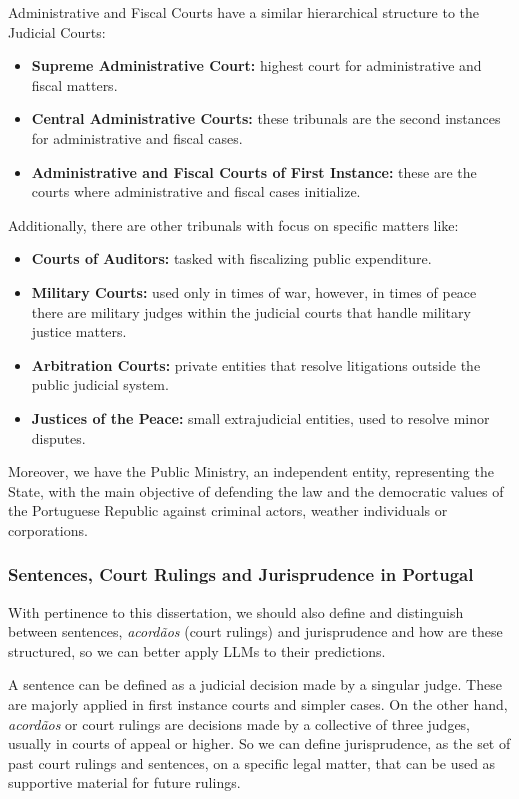 \documentclass[11pt,a4paper,twoside,openright]{book}
\begin{document}
Administrative and Fiscal Courts have a similar hierarchical structure to the Judicial Courts:

\begin{itemize}

    \item \textbf{Supreme Administrative Court:} highest court for administrative and fiscal matters.
    \item \textbf{Central Administrative Courts:} these tribunals are the second instances for administrative and fiscal cases.
    \item \textbf{Administrative and Fiscal Courts of First Instance:} these are the courts where administrative and fiscal cases initialize.        
\end{itemize}

Additionally, there are other tribunals with focus on specific matters like:
\begin{itemize}
    \item \textbf{Courts of Auditors:} tasked with fiscalizing public expenditure.
    \item \textbf{Military Courts:} used only in times of war, however, in times of peace there are military judges within the judicial courts that handle military justice matters.
    \item \textbf{Arbitration Courts:} private entities that resolve litigations outside the public judicial system.
    \item \textbf{Justices of the Peace:} small extrajudicial entities, used to resolve minor disputes.
\end{itemize}


\par Moreover, we have the Public Ministry, an independent entity, representing the State, with the main objective of defending the law and the democratic values of the Portuguese Republic against criminal actors, weather individuals or corporations.

\subsubsection{Sentences, Court Rulings and Jurisprudence in Portugal}
With pertinence to this dissertation, we should also define and distinguish between sentences, \textit{acordãos} (court rulings) and jurisprudence and how are these structured, so we can better apply LLMs to their predictions.

\par A sentence can be defined as a judicial decision made by a singular judge. These are majorly applied in first instance courts and simpler cases. 
On the other hand, \textit{acordãos} or court rulings are decisions made by a collective of three judges, usually in courts of appeal or higher.
So we can define jurisprudence, as the set of past court rulings and sentences, on a specific legal matter, that can be used as supportive material for future rulings.
\end{document}
